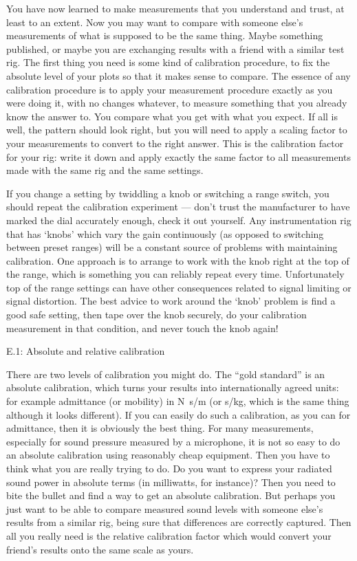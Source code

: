 
  You have now learned to make measurements that you understand and trust, at 
  least to an extent. Now you may want to compare with someone else’s 
  measurements of what is supposed to be the same thing. Maybe something 
  published, or maybe you are exchanging results with a friend with a similar 
  test rig. The first thing you need is some kind of calibration procedure, to 
  fix the absolute level of your plots so that it makes sense to compare. The 
  essence of any calibration procedure is to apply your measurement procedure 
  exactly as you were doing it, with no changes whatever, to measure something 
  that you already know the answer to. You compare what you get with what you 
  expect. If all is well, the pattern should look right, but you will need to 
  apply a scaling factor to your measurements to convert to the right answer. 
  This is the calibration factor for your rig: write it down and apply exactly 
  the same factor to all measurements made with the same rig and the same 
  settings. 

  If you change a setting by twiddling a knob or switching a range switch, you 
  should repeat the calibration experiment — don’t trust the manufacturer to 
  have marked the dial accurately enough, check it out yourself. Any 
  instrumentation rig that has ‘knobs’ which vary the gain continuously (as 
  opposed to switching between preset ranges) will be a constant source of 
  problems with maintaining calibration. One approach is to arrange to work 
  with the knob right at the top of the range, which is something you can 
  reliably repeat every time. Unfortunately top of the range settings can have 
  other consequences related to signal limiting or signal distortion. The best 
  advice to work around the ‘knob’ problem is find a good safe setting, then 
  tape over the knob securely, do your calibration measurement in that 
  condition, and never touch the knob again! 

  E.1: Absolute and relative calibration 

  There are two levels of calibration you might do. The “gold standard” is an 
  absolute calibration, which turns your results into internationally agreed 
  units: for example admittance (or mobility) in N~s/m (or s/kg, which is the 
  same thing although it looks different). If you can easily do such a 
  calibration, as you can for admittance, then it is obviously the best thing. 
  For many measurements, especially for sound pressure measured by a 
  microphone, it is not so easy to do an absolute calibration using reasonably 
  cheap equipment. Then you have to think what you are really trying to do. Do 
  you want to express your radiated sound power in absolute terms (in 
  milliwatts, for instance)? Then you need to bite the bullet and find a way to 
  get an absolute calibration. But perhaps you just want to be able to compare 
  measured sound levels with someone else’s results from a similar rig, being 
  sure that differences are correctly captured. Then all you really need is the 
  relative calibration factor which would convert your friend’s results onto 
  the same scale as yours. 

